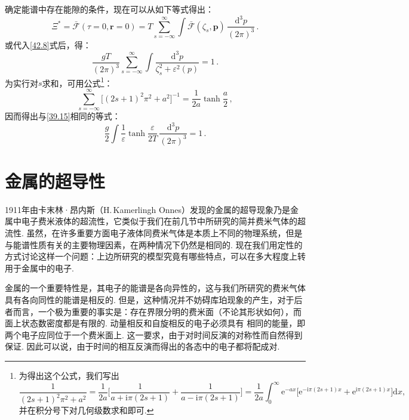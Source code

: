 确定能谱中存在能隙的条件，现在可以从如下等式得出：
\begin{equation*}
\Xi^{*} = \bar{\mathcal F}(\tau=0,\bm r=0)
= T\sum_{s=-\infty}^{\infty}\int\bar{\mathcal F}(\zeta_s,\bm p)\,\frac{\mathrm d^3p}{(2\pi)^3}\,.
\end{equation*}
或代入\eqref{42.8}式后，得：
\begin{equation}
\frac{gT}{(2\pi)^3}\sum_{s=-\infty}^{\infty}\int\frac{\mathrm d^3p}{\zeta_s^2+\varepsilon^2(p)} = 1\,.
\label{42.9}
\end{equation}
为实行对$s$求和，可用公式\footnote{为得出这个公式，我们写出
\begin{equation*}
\frac{1}{(2s+1)^2\pi^2+a^2}=\frac{1}{2a}\Biggl[\frac{1}{a+\mathrm i\pi(2s+1)}+\frac{1}{a-\mathrm i\pi(2s+1)}\Biggr]
=\frac{1}{2a}\int_0^{\infty}\mathrm e^{-ax}\bigl[\mathrm e^{-\mathrm i\pi(2s+1)x}+\mathrm e^{\mathrm i\pi(2s+1)x}\bigr]\mathrm dx,
\end{equation*}
并在积分号下对几何级数求和即可.}：
\begin{equation}
\sum_{s=-\infty}^{\infty}\bigl[(2s+1)^2\pi^2+a^2\bigr]^{-1} = \frac{1}{2a}\tanh\frac{a}{2}\,,
\label{42.10}
\end{equation}
因而得出与\eqref{39.15}相同的等式：
\begin{equation}
\frac{g}{2}\int\frac{1}{\varepsilon}\tanh\frac{\varepsilon}{2T}\,\frac{\mathrm d^3p}{(2\pi)^3} = 1\,.
\label{42.11}
\end{equation}

\section{金属的超导性}

1911年由卡末林·昂内斯（H.\,Kamerlingh Onnes）发现的金属的超导现象乃是金属中电子费米液体的超流性，它类似于我们在前几节中所研究的简并费米气体的超流性. 虽然，在许多重要方面电子液体同费米气体是本质上不同的物理系统，但是与能谱性质有关的主要物理因素，在两种情况下仍然是相同的. 现在我们用定性的方式讨论这样一个问题：上边所研究的模型究竟有哪些特点，可以在多大程度上转用于金属中的电子.

金属的一个重要特性是，其电子的能谱是各向异性的，这与我们所研究的费米气体具有各向同性的能谱是相反的. 但是，这种情况并不妨碍库珀现象的产生，对于后者而言，一个极为重要的事实是：存在界限分明的费米面（不论其形状如何），而面上状态数密度都是有限的. 动量相反和自旋相反的电子必须具有
相同的能量，即两个电子应同位于一个费米面上. 这一要求，由于对时间反演的对称性而自然得到保证. 因此可以说，由于时间的相互反演而得出的各态中的电子都将配成对.

